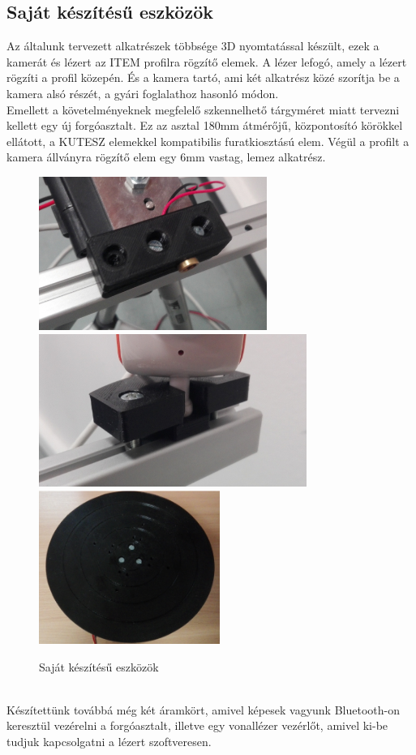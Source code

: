 \documentclass[12pt,a4paper]{article}
\begin{document}
\subsection{Saját készítésű eszközök}
Az általunk tervezett alkatrészek többsége 3D nyomtatással készült, ezek a kamerát és lézert az ITEM profilra rögzítő elemek. A lézer lefogó, amely a lézert rögzíti a profil közepén. És a kamera tartó, ami két alkatrész közé szorítja be a kamera alsó részét, a gyári foglalathoz hasonló módon.\\[10pt]
Emellett a követelményeknek megfelelő szkennelhető tárgyméret miatt tervezni kellett egy új forgóasztalt. Ez az asztal 180mm átmérőjű, központosító körökkel ellátott, a KUTESZ elemekkel kompatibilis furatkiosztású elem.
Végül a profilt a kamera állványra rögzítő elem egy 6mm vastag,  lemez alkatrész.
 \begin{figure}[h!]
 	\centering
	\includegraphics[height=5cm]{images/lezerlefogo}
	\includegraphics[height=5cm]{images/kameratarto}
	\includegraphics[height=5cm]{images/asztal}
	\caption{Saját készítésű eszközök}
\end{figure}\\[10pt]
Készítettünk továbbá még két áramkört, amivel képesek vagyunk Bluetooth-on keresztül vezérelni a forgóasztalt, illetve egy vonallézer vezérlőt, amivel ki-be tudjuk kapcsolgatni a lézert szoftveresen. 
\end{document}
